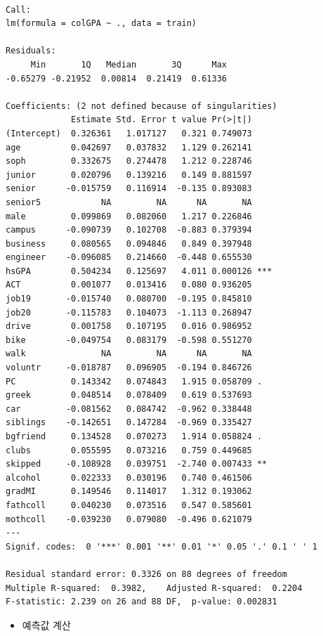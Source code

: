 \documentclass[
  letterpaper,
  DIV=11,
  numbers=noendperiod]{scrartcl}
\providecommand{\tightlist}{%
  \setlength{\itemsep}{0pt}\setlength{\parskip}{0pt}}\usepackage{longtable,booktabs,array}
\begin{document}
\begin{verbatim}

Call:
lm(formula = colGPA ~ ., data = train)

Residuals:
     Min       1Q   Median       3Q      Max 
-0.65279 -0.21952  0.00814  0.21419  0.61336 

Coefficients: (2 not defined because of singularities)
             Estimate Std. Error t value Pr(>|t|)    
(Intercept)  0.326361   1.017127   0.321 0.749073    
age          0.042697   0.037832   1.129 0.262141    
soph         0.332675   0.274478   1.212 0.228746    
junior       0.020796   0.139216   0.149 0.881597    
senior      -0.015759   0.116914  -0.135 0.893083    
senior5            NA         NA      NA       NA    
male         0.099869   0.082060   1.217 0.226846    
campus      -0.090739   0.102708  -0.883 0.379394    
business     0.080565   0.094846   0.849 0.397948    
engineer    -0.096085   0.214660  -0.448 0.655530    
hsGPA        0.504234   0.125697   4.011 0.000126 ***
ACT          0.001077   0.013416   0.080 0.936205    
job19       -0.015740   0.080700  -0.195 0.845810    
job20       -0.115783   0.104073  -1.113 0.268947    
drive        0.001758   0.107195   0.016 0.986952    
bike        -0.049754   0.083179  -0.598 0.551270    
walk               NA         NA      NA       NA    
voluntr     -0.018787   0.096905  -0.194 0.846726    
PC           0.143342   0.074843   1.915 0.058709 .  
greek        0.048514   0.078409   0.619 0.537693    
car         -0.081562   0.084742  -0.962 0.338448    
siblings    -0.142651   0.147284  -0.969 0.335427    
bgfriend     0.134528   0.070273   1.914 0.058824 .  
clubs        0.055595   0.073216   0.759 0.449685    
skipped     -0.108928   0.039751  -2.740 0.007433 ** 
alcohol      0.022333   0.030196   0.740 0.461506    
gradMI       0.149546   0.114017   1.312 0.193062    
fathcoll     0.040230   0.073516   0.547 0.585601    
mothcoll    -0.039230   0.079080  -0.496 0.621079    
---
Signif. codes:  0 '***' 0.001 '**' 0.01 '*' 0.05 '.' 0.1 ' ' 1

Residual standard error: 0.3326 on 88 degrees of freedom
Multiple R-squared:  0.3982,    Adjusted R-squared:  0.2204 
F-statistic: 2.239 on 26 and 88 DF,  p-value: 0.002831
\end{verbatim}

\begin{itemize}
\tightlist
\item
  예측값 계산
\end{itemize}
\end{document}

